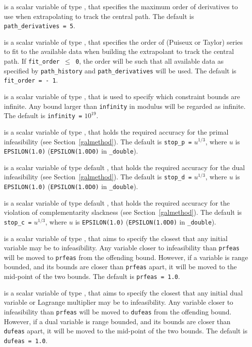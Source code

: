 \begin{description}
 is a scalar variable of type \integer, that 
specifies the maximum order of derivatives to use when extrapolating
to track the central path.
The default is {\tt path\_derivatives = 5}.

 is a scalar variable of type \integer, that 
specifies the order of (Puiseux or Taylor) series to fit to the available data 
when building the extrapolant to track the central path. If {\tt fit\_order
$\leq$ 0}, the order will be such that all available data as specified by
{\tt path\_history} and {\tt path\_derivatives} will be used.
The default is {\tt fit\_order = - 1}.

 is a scalar variable of type \realdp, that is used to
specify which constraint bounds are infinite.
Any bound larger than {\tt infinity} in modulus will be regarded as infinite.
The default is {\tt infinity =} $10^{19}$.

 is a scalar variable of type \realdp, that holds the
required accuracy for the primal infeasibility (see Section~\ref{galmethod}).
The default is {\tt stop\_p =} $u^{1/3}$,
where $u$ is {\tt EPSILON(1.0)} ({\tt EPSILON(1.0D0)} in 
{\tt \fullpackagename\_double}).

 is a scalar variable of type default 
\realdp, that holds the
required accuracy for the dual infeasibility (see Section~\ref{galmethod}).
The default is {\tt stop\_d =} $u^{1/3}$,
where $u$ is {\tt EPSILON(1.0)} ({\tt EPSILON(1.0D0)} in 
{\tt \fullpackagename\_double}).

 is a scalar variable of type default 
\realdp, that holds the
required accuracy for the violation of complementarity slackness 
(see Section~\ref{galmethod}).
The default is {\tt stop\_c =} $u^{1/3}$,
where $u$ is {\tt EPSILON(1.0)} ({\tt EPSILON(1.0D0)} in 
{\tt \fullpackagename\_double}).

 is a scalar variable of type \realdp, that aims to specify
the closest that any initial variable may be to infeasibility. Any variable
closer to infeasibility than {\tt prfeas} will be moved to {\tt prfeas} from 
the offending bound. However, if a variable is range bounded, and its bounds 
are closer than {\tt prfeas} apart, it will be moved to the mid-point of the 
two bounds.
The default is {\tt prfeas = 1.0}.

 is a scalar variable of type \realdp, that aims to specify
the closest that any initial dual variable or Lagrange multiplier may be to 
infeasibility. Any variable closer to infeasibility than {\tt prfeas} will be
moved to {\tt dufeas} from the offending bound. However, if a dual variable
is range bounded, and its bounds are closer than {\tt dufeas} apart, it will
be moved to the mid-point of the two bounds.
The default is {\tt dufeas = 1.0}.


\end{description}
